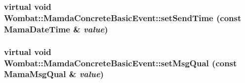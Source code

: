 \hypertarget{classWombat_1_1MamdaConcreteBasicEvent_1936e887bdbf9abee38ee0d04b015dd6}{
\subsubsection[setSendTime]{\setlength{\rightskip}{0pt plus 5cm}virtual void Wombat::Mamda\-Concrete\-Basic\-Event::set\-Send\-Time (const Mama\-Date\-Time \& {\em value})}}
\label{classWombat_1_1MamdaConcreteBasicEvent_1936e887bdbf9abee38ee0d04b015dd6}


\hypertarget{classWombat_1_1MamdaConcreteBasicEvent_d7cce8e8e3a8b84de6a8fd34745eee8c}{
\subsubsection[setMsgQual]{\setlength{\rightskip}{0pt plus 5cm}virtual void Wombat::Mamda\-Concrete\-Basic\-Event::set\-Msg\-Qual (const Mama\-Msg\-Qual \& {\em value})}}
\label{classWombat_1_1MamdaConcreteBasicEvent_d7cce8e8e3a8b84de6a8fd34745eee8c}


